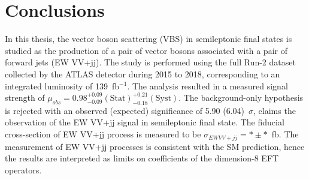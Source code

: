 \chapter{Conclusions}
\label{chap:conclusions}

In this thesis, the vector boson scattering (VBS) in semileptonic final states is studied as the production of a pair of vector bosons associated with a pair of forward jets (EW VV+jj). 
The study is performed using the full Run-2 dataset collected by the ATLAS detector during 2015 to 2018, corresponding to an integrated luminosity of 139~fb$^{-1}$.
The analysis resulted in a measured signal strength of $\mu_{obs} = 0.98^{+ 0.09}_{- 0.09}(\mathrm{Stat})^{+ 0.21}_{- 0.18}(\mathrm{Syst})$.
The background-only hypothesis is rejected with an observed (expected) significance of 5.90 (6.04)~$\sigma$, claims the observation of the EW VV+jj signal in semileptonic final state. 
The fiducial cross-section of EW VV+jj process is measured to be $\sigma_{EW VV+jj} = * \pm * $~fb.
The measurement of EW VV+jj processes is consistent with the SM prediction, hence the results are interpreted as limits on coefficients of the dimension-8 EFT operators.




